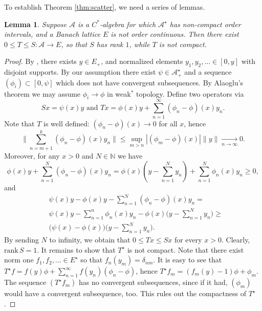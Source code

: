 \documentclass[12pt]{amsart}
\theoremstyle{plain}
\newtheorem{lemma}[theorem]{Lemma}
\theoremstyle{definition}
\newcommand{\norm}[1]{\lVert#1\rVert}
\renewcommand{\leq}{\leqslant}
\renewcommand{\geq}{\geqslant}\usepackage{amssymb}
\newcommand{\A}{\mathcal{A}}
\def \rank{{\mathrm{rank}} \, }
\begin{document}
To establish Theorem \ref{thm:scatter}, we need a series of lemmas.

\begin{lemma}\label{lem:not_comp}
Suppose $\A$ is a $C^*$-algebra for which $\A^\star$ has non-compact
order intervals, and a Banach lattice $E$ is not order continuous.
Then there exist $0 \leq T \leq S : \A \to E$,
so that $S$ has rank $1$, while $T$ is not compact.
\end{lemma}


\begin{proof}%
By \cite[Theorem 2.4.2]{M-N},
there exists $y \in E_+$, and normalized elements
$y_1, y_2, \ldots \in [0,y]$ with disjoint supports.
By our assumption there exist $\psi \in \A^\star_{+}$ and a sequence
$(\phi_i) \subset [0, \psi]$ which does not have convergent subsequences.
By Alaoglu\rq{s} theorem we may assume $\phi_i \to \phi$ in weak$^*$ topology.
Define  two operators via
\begin{displaymath}
Sx=\psi(x)y \text{ and } Tx=\phi(x)y+\sum_{n=1}^{\infty}{(\phi_n-\phi)(x)y_n}.
\end{displaymath}
Note that $T$ is well defined: $(\phi_n -\phi)(x) \to 0$ for all $x$, hence
\begin{displaymath}
\norm{\sum_{n=m+1}^{k}{(\phi_n-\phi)(x)y_n}} \leq
 \sup_{m > n}|(\phi_m-\phi)(x)|\norm{y}
{\underset{n \to \infty}{\longrightarrow}} 0 .
\end{displaymath}
Moreover, for  any $x>0$ and $N \in \mathbb{N}$ we have
\begin{equation*}
 \phi(x)y+\sum_{n=1}^{N}{(\phi_n-\phi)(x)y_n}=
\phi(x)(y-\sum_{n=1}^{N}{y_n})+\sum_{n=1}^{N}{\phi_n(x)} y_n \ge 0 ,
\end{equation*}
and
\begin{eqnarray*}
  & \psi(x) y - \phi(x) y - \sum_{n=1}^N (\phi_n-\phi)(x)y_n = \\
  & \psi(x) y - \sum_{n=1}^n \phi_n(x) y_n -
     \phi(x) \big( y - \sum_{n=1}^N y_n \big) \geq \\
  & \big( \psi(x) - \phi(x) \big) \big( y - \sum_{n=1}^N y_n \big) .
\end{eqnarray*}
By sending $N$ to infinity, we obtain that $0 \le Tx \le Sx$ for every $x>0$.
Clearly, $\rank S = 1$. It remains to show that $T^\star$ is not compact.
Note that there exist norm one $f_1, f_2, \ldots \in E^\star$ so that
$f_n(y_m) = \delta_{nm}$.
It is easy to see that
$T^\star f = f(y) \phi + \sum_{n=1}^\infty f(y_n) (\phi_n - \phi)$, hence
$T^\star  f_m = (f_m(y) - 1) \phi + \phi_m$. The sequence
$(T^\star f_m)$ has no
convergent subsequences, since if it had, $(\phi_m)$ would have
a convergent subsequence, too. This rules out the compactness of $T^\star$.
\end{proof}
\end{document}
